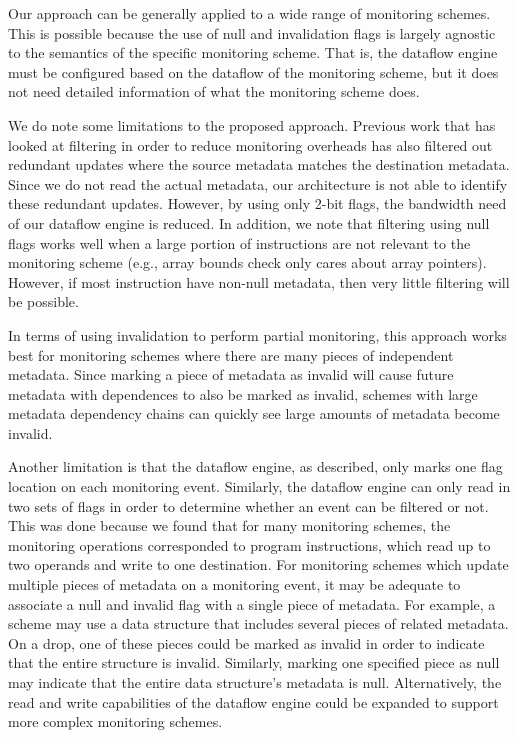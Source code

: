 Our approach can be generally applied to a wide range of monitoring schemes. This
is possible because the use of null and invalidation flags is largely agnostic
to the semantics of the specific monitoring scheme. That is, the dataflow
engine must be configured based on the dataflow of the monitoring scheme, but
it does not need detailed information of what the monitoring scheme does. 

We do note some limitations to the proposed approach. Previous work
\cite{fade-hpca14} that has looked at filtering in order to reduce monitoring
overheads has also filtered out redundant updates where the source metadata
matches the destination metadata. Since we do not read the actual metadata, our
architecture is not able to identify these redundant updates. However, by using
only 2-bit flags, the bandwidth need of our dataflow engine is reduced.  
In addition, we note that filtering using null flags works well when a large
portion of instructions are not relevant to the monitoring scheme (e.g., array
bounds check only cares about array pointers). However, if most instruction
have non-null metadata, then very little filtering will be possible. 

In terms of using invalidation to perform partial monitoring, this 
approach works best for monitoring schemes where there are many pieces of
independent metadata. Since marking a piece of metadata as invalid will cause
future metadata with dependences to also be marked as invalid, schemes with
large metadata dependency chains can quickly see large amounts of metadata
become invalid. 

Another limitation is that the dataflow engine, as described, only marks one
flag location on each monitoring event. Similarly, the dataflow engine can only
read in two sets of flags in order to determine whether an event can be
filtered or not. This was done because we found that for many monitoring
schemes, the monitoring operations corresponded to program instructions, which
read up to two operands and write to one destination.  For monitoring schemes
which update multiple pieces of metadata on a monitoring event, it may be
adequate to associate a null and invalid flag with a single piece of metadata.  For
example, a scheme may use a data structure that includes several pieces of
related metadata. On a drop, one of these pieces could be marked as invalid in
order to indicate that the entire structure is invalid.  Similarly, marking one
specified piece as null may indicate that the entire data structure's metadata
is null.  Alternatively, the read and write capabilities of the dataflow
engine could be expanded to support more complex monitoring schemes.
